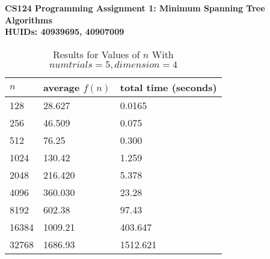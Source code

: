 \documentclass[11pt]{article}
\begin{document}
\textbf{CS124 Programming Assignment 1: Minimum Spanning Tree Algorithms\\
	HUIDs: 40939695, 40907009}
	\begin{table}[h]
		\centering
		\caption{Results for Values of $n$ With $numtrials = 5, dimension = 4$}
		\begin{tabular}{lll}
			$n$                         & average $f(n)$                        & total time (seconds)                        \\ \hline
			\multicolumn{1}{|l|}{128} & \multicolumn{1}{l|}{28.627} & \multicolumn{1}{l|}{0.0165} \\ \hline
			\multicolumn{1}{|l|}{256}    & \multicolumn{1}{l|}{46.509}       & \multicolumn{1}{l|}{0.075}       \\ \hline
			\multicolumn{1}{|l|}{512}    & \multicolumn{1}{l|}{76.25}       & \multicolumn{1}{l|}{0.300}       \\ \hline
			\multicolumn{1}{|l|}{1024}    & \multicolumn{1}{l|}{130.42}       & \multicolumn{1}{l|}{1.259}       \\ \hline
			\multicolumn{1}{|l|}{2048}    & \multicolumn{1}{l|}{216.420}       & \multicolumn{1}{l|}{5.378}       \\ \hline
			\multicolumn{1}{|l|}{4096}    & \multicolumn{1}{l|}{360.030}       & \multicolumn{1}{l|}{23.28}       \\ \hline
			\multicolumn{1}{|l|}{8192}    & \multicolumn{1}{l|}{602.38}       & \multicolumn{1}{l|}{97.43}       \\ \hline
			\multicolumn{1}{|l|}{16384}    & \multicolumn{1}{l|}{1009.21}       & \multicolumn{1}{l|}{403.647}       \\ \hline
			\multicolumn{1}{|l|}{32768}    & \multicolumn{1}{l|}{1686.93}       & \multicolumn{1}{l|}{1512.621}       \\ \hline
		\end{tabular}
	\end{table}
	
\end{document}
